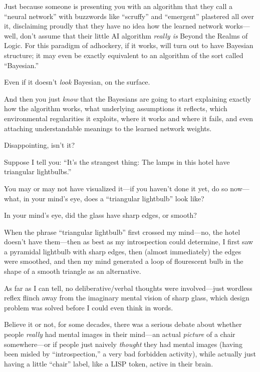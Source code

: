{
 Just because someone is presenting you with an algorithm that they
call a ``neural network'' with
buzzwords like ``scruffy'' and
``emergent'' plastered all over it,
disclaiming proudly that they have no idea how the learned network
works---well, don't assume that their little AI
algorithm \textit{really is} Beyond the Realms of Logic. For this
paradigm of adhockery, if it works, will turn out to have Bayesian
structure; it may even be exactly equivalent to an algorithm of the
sort called ``Bayesian.''}

{
 Even if it doesn't \textit{look} Bayesian, on the
surface.}

{
 And then you just \textit{know} that the Bayesians are going to
start explaining exactly how the algorithm works, what underlying
assumptions it reflects, which environmental regularities it exploits,
where it works and where it fails, and even attaching understandable
meanings to the learned network weights.}

{
 Disappointing, isn't it?}

\myendsectiontext


{
 Suppose I tell you: ``It's the
strangest thing: The lamps in this hotel have triangular
lightbulbs.''}

{
 You may or may not have visualized it---if you
haven't done it yet, do so now---what, in your
mind's eye, does a ``triangular
lightbulb'' look like?}

{
 In your mind's eye, did the glass have sharp
edges, or smooth?}

{
 When the phrase ``triangular
lightbulb'' first crossed my mind---no, the hotel
doesn't have them---then as best as my introspection
could determine, I first saw a pyramidal lightbulb with sharp edges,
then (almost immediately) the edges were smoothed, and then my mind
generated a loop of flourescent bulb in the shape of a smooth triangle
as an alternative.}

{
 As far as I can tell, no deliberative/verbal thoughts were
involved---just wordless reflex flinch away from the imaginary mental
vision of sharp glass, which design problem was solved before I could
even think in words.}

{
 Believe it or not, for some decades, there was a serious debate
about whether people \textit{really} had mental images in their
mind---an actual \textit{picture} of a chair somewhere---or if people
just naively \textit{thought} they had mental images (having been
misled by ``introspection,'' a very
bad forbidden activity), while actually just having a little
``chair'' label, like a LISP token,
active in their brain.}

